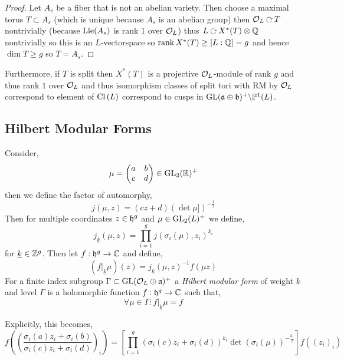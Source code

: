 \documentclass[12pt]{article}
\begin{document}
\begin{proof}
Let $A_s$ be a fiber that is not an abelian variety. Then choose a maximal torus $T \subset A_s$ (which is unique because $A_s$ is an abelian group) then $\struct{L} \acts T$ nontrivially (because $\mathrm{Lie}(A_s)$ is rank $1$ over $\mathcal{O}_{L}$) thus $L \acts X^*(T) \ot \Q$ nontrivially so this is an $L$-vectorspace so $\operatorname{\mathrm{rank}}{X^*(T)} \ge [L : \mathbb{Q}] = g$ and hence $\dim{T} \ge g$ so $T = A_s$. 
\end{proof}

\begin{rmk}
Furthermore, if $T$ is split then $X^*(T)$ is a projective $\mathcal{O}_{L}$-module of rank $g$ and thus rank $1$ over $\mathcal{O}_{L}$ and thus isomorphism classes of split tori with RM by $\mathcal{O}_{L}$ correspond to element of $\mathrm{Cl} \left( L \right)$ correspond to cusps in $\mathrm{GL}(\mathfrak{a} \oplus \mathfrak{b})^+ \backslash \mathbb{P}^1(L)$. 
\end{rmk}

\subsection{Hilbert Modular Forms}

\begin{defn}
Consider,
\[ \mu = \begin{pmatrix}
a & b 
\\
c & d
\end{pmatrix} \in \mathrm{GL}_2(\mathbb{R})^+ \]
then we define the factor of automorphy,
\[ j(\mu, z) = (c z + d) (\det{\mu]})^{-\frac{1}{2}} \]
Then for multiple coordinates $z \in \mathfrak{h}^g$ and $\mu \in \mathrm{GL}_2(L)^+$ we define,
\[ j_{\underline{k}}(\mu, z) = \prod_{i = 1}^g j(\sigma_i(\mu), z_i)^{k_i} \]
for $\underline{k} \in \mathbb{Z}^g$. Then let $f : \mathfrak{h}^g \to \mathbb{C}$ and define,
\[ (f|_{\underline{k}} \mu)(z) = j_{\underline{k}}(\mu, z)^{-1} f(\mu z) \]
For a finite index subgroup $\Gamma \subset \mathrm{GL}(\mathcal{O}_{L} \oplus \mathfrak{a})^+$ a \textit{Hilbert modular form} of weight $\underline{k}$ and level $\Gamma$ is a holomorphic function $f : \mathfrak{h}^g \to \mathbb{C}$ such that,
\[ \forall \mu \in \Gamma : f|_{\underline{k}} \mu = f \]
\end{defn}

\begin{rmk}
Explicitly, this becomes,
\[ f \left( \left( \frac{\sigma_i(a) z_i + \sigma_i(b)}{\sigma_i(c) z_i + \sigma_i(d)} \right)_i \right) = \left[ \prod_{i = 1}^g \left( \sigma_i(c) z_i + \sigma_i(d) \right)^{k_i} \det{(\sigma_i(\mu))}^{-\frac{k_i}{2}} \right] f((z_i)_i) \]
\end{rmk}
\end{document}
